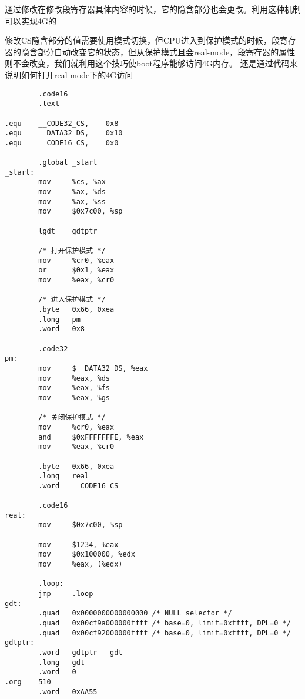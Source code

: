 通过修改在修改段寄存器具体内容的时候，它的隐含部分也会更改。利用这种机制可以实现4G的

修改CS隐含部分的值需要使用模式切换，但CPU进入到保护模式的时候，段寄存器的隐含部分自动改变它的状态，但从保护模式且会real-mode，段寄存器的属性则不会改变，我们就利用这个技巧使boot程序能够访问4G内存。
还是通过代码来说明如何打开real-mode下的4G访问
\begin{lstlisting}
        .code16
        .text

.equ    __CODE32_CS,    0x8
.equ    __DATA32_DS,    0x10
.equ    __CODE16_CS,    0x0

        .global _start
_start:
        mov     %cs, %ax
        mov     %ax, %ds
        mov     %ax, %ss
        mov     $0x7c00, %sp

        lgdt    gdtptr

        /* 打开保护模式 */
        mov     %cr0, %eax
        or      $0x1, %eax
        mov     %eax, %cr0

        /* 进入保护模式 */
        .byte   0x66, 0xea
        .long   pm
        .word   0x8

        .code32
pm:
        mov     $__DATA32_DS, %eax
        mov     %eax, %ds
        mov     %eax, %fs
        mov     %eax, %gs

        /* 关闭保护模式 */
        mov     %cr0, %eax
        and     $0xFFFFFFFE, %eax
        mov     %eax, %cr0

        .byte   0x66, 0xea
        .long   real
        .word   __CODE16_CS

        .code16
real:
        mov     $0x7c00, %sp

        mov     $1234, %eax
        mov     $0x100000, %edx
        mov     %eax, (%edx)

        .loop:
        jmp     .loop
gdt:
        .quad   0x0000000000000000 /* NULL selector */
        .quad   0x00cf9a000000ffff /* base=0, limit=0xffff, DPL=0 */
        .quad   0x00cf92000000ffff /* base=0, limit=0xffff, DPL=0 */
gdtptr:
        .word   gdtptr - gdt
        .long   gdt
        .word   0
.org    510
        .word   0xAA55
\end{lstlisting}


